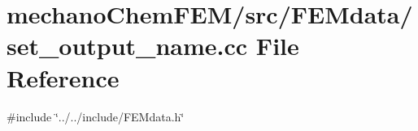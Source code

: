 \section{mechano\+Chem\+F\+E\+M/src/\+F\+E\+Mdata/set\+\_\+output\+\_\+name.cc File Reference}
\label{set__output__name_8cc}
{\ttfamily \#include \char`\"{}../../include/\+F\+E\+Mdata.\+h\char`\"{}}\newline

